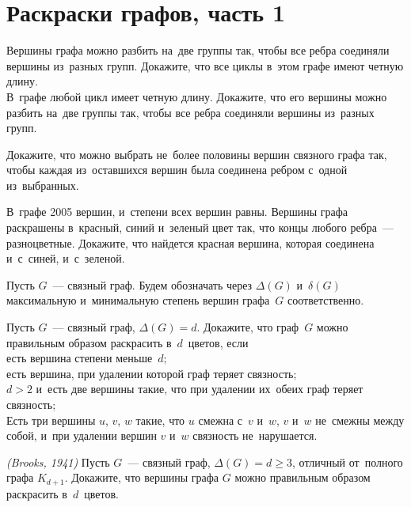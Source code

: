 

\section*{Раскраски графов, часть 1}


\begin{problems}

\item
\sbp
Вершины графа можно разбить на~две группы так, чтобы все ребра соединяли
вершины из~разных групп.
Докажите, что все циклы в~этом графе имеют четную длину.
\\
\sbp
В~графе любой цикл имеет четную длину.
Докажите, что его вершины можно разбить на~две группы так, чтобы все ребра
соединяли вершины из~разных групп.

\item
Докажите, что можно выбрать не~более половины вершин связного графа так, чтобы
каждая из~оставшихся вершин была соединена ребром с~одной из~выбранных.

\item
В~графе 2005 вершин, и~степени всех вершин равны.
Вершины графа раскрашены в~красный, синий и~зеленый цвет так, что концы любого
ребра~--- разноцветные.
Докажите, что найдется красная вершина, которая соединена и~с~синей,
и~с~зеленой.

\end{problems}

Пусть $G$~--- связный граф.
Будем обозначать через $\Delta (G)$ и~$\delta (G)$ максимальную и~минимальную
степень вершин графа~$G$ соответственно.

\begin{problems}

\item
Пусть $G$~--- связный граф, $\Delta(G) = d$.
Докажите, что граф~$G$ можно правильным образом раскрасить в~$d$~цветов, если
\\
\sbp
есть вершина степени меньше~$d$;
\\
\sbp
есть вершина, при удалении которой граф теряет связность;
\\
\sbp
$d > 2$ и~есть две вершины такие, что при удалении их~обеих граф теряет
связность;
\\
\sbp
Есть три вершины $u$, $v$, $w$ такие, что $u$ смежна с~$v$ и~$w$,
$v$ и~$w$ не~смежны между собой, и~при удалении вершин $v$ и~$w$ связность
не~нарушается.


\item\emph{(Brooks, 1941)}
Пусть $G$~--- связный граф, $\Delta(G) = d \geq 3$, отличный от~полного графа
$K_{d+1}$.
Докажите, что вершины графа $G$ можно правильным образом раскрасить
в~$d$~цветов.

\end{problems}

